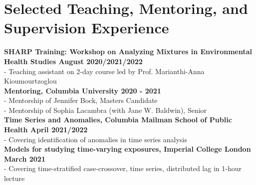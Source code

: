 \section*{Selected Teaching, Mentoring, and Supervision Experience}

\noindent \textbf{SHARP Training: Workshop on Analyzing Mixtures in Environmental Health Studies \hfill August 2020/2021/2022}\\
\noindent - Teaching assistant on 2-day course led by Prof. Marianthi-Anna Kioumourtzoglou\\

\noindent \textbf{Mentoring, Columbia University \hfill 2020 - 2021}\\
\noindent - Mentorship of Jennifer Bock, Masters Candidate\\
\noindent - Mentorship of Sophia Lacambra (with Jane W. Baldwin), Senior\\

\noindent \textbf{Time Series and Anomalies, Columbia Mailman School of Public Health \hfill April 2021/2022}\\
\noindent - Covering identification of anomalies in time series analysis\\


\noindent \textbf{Models for studying time-varying exposures, Imperial College London \hfill March 2021}\\
\noindent - Covering time-stratified case-crossover, time series, distributed lag in 1-hour lecture\\



